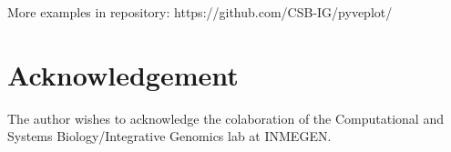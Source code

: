 \documentclass{bioinfo}
\begin{document}
More examples in repository: https://github.com/CSB-IG/pyveplot/


\section*{Acknowledgement}
The author wishes to acknowledge the colaboration of the Computational and Systems
Biology/Integrative Genomics lab at INMEGEN.


%
%
%
%

\begin{thebibliography}{}


\end{thebibliography}
\end{document}
